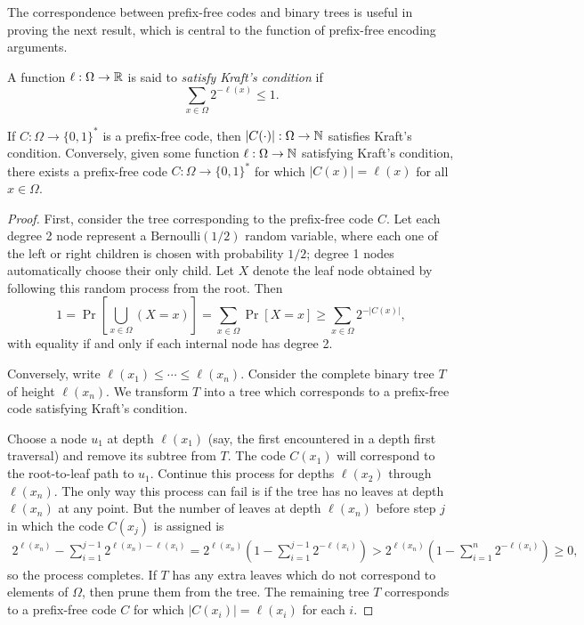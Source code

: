 The correspondence between prefix-free codes and binary trees is
useful in proving the next result, which is central to the function of
prefix-free encoding arguments.
\begin{defn}
  A function $\ell : \Omega \to \mathbb{R}$ is said to \emph{satisfy Kraft's
    condition} if
  \[\sum_{x \in \Omega} 2^{-\ell(x)} \leq 1.\]
\end{defn}

\begin{lem}
  If $C : \Omega \to \{0, 1\}^*$ is a prefix-free code, then
  $|C(\cdot)| : \Omega \to \mathbb{N}$ satisfies Kraft's
  condition. Conversely, given some function $\ell : \Omega \to \mathbb{N}$
  satisfying Kraft's condition, there exists a prefix-free code
  $C : \Omega \to \{0, 1\}^*$ for which $|C(x)| = \ell(x)$ for all
  $x \in \Omega$.
\end{lem}
\begin{proof}
  First, consider the tree corresponding to the prefix-free code
  $C$. Let each degree 2 node represent a $\text{Bernoulli}(1/2)$
  random variable, where each one of the left or right children is
  chosen with probability $1/2$; degree 1 nodes automatically choose
  their only child. Let $X$ denote the leaf node obtained by following
  this random process from the root. Then
  \[1 = \Pr\left[\bigcup_{x \in \Omega} (X = x)\right] = \sum_{x \in \Omega} \Pr[X =
  x] \geq \sum_{x \in \Omega} 2^{-|C(x)|},\]
  with equality if and only if each internal node has degree 2.

  Conversely, write $\ell(x_1) \leq \cdots \leq \ell(x_n)$. Consider
  the complete binary tree $T$ of height $\ell(x_n)$. We transform $T$
  into a tree which corresponds to a prefix-free code satisfying
  Kraft's condition.

  Choose a node $u_1$ at depth $\ell(x_1)$ (say, the first encountered
  in a depth first traversal) and remove its subtree from $T$. The
  code $C(x_1)$ will correspond to the root-to-leaf path to
  $u_1$. Continue this process for depths $\ell(x_2)$ through
  $\ell(x_n)$. The only way this process can fail is if the tree has
  no leaves at depth $\ell(x_n)$ at any point. But the number of
  leaves at depth $\ell(x_n)$ before step $j$ in which the code
  $C(x_j)$ is assigned is
  \begin{align*}
    2^{\ell(x_n)} - \sum_{i = 1}^{j - 1} 2^{\ell(x_n) - \ell(x_i)} =
    2^{\ell(x_n)}\left(1 - \sum_{i = 1}^{j - 1} 2^{-\ell(x_i)}\right)
    > 2^{\ell(x_n)}\left(1 - \sum_{i = 1}^n 2^{-\ell(x_i)}\right)
    \geq 0,
  \end{align*}
  so the process completes. If $T$ has any extra leaves which do not
  correspond to elements of $\Omega$, then prune them from the
  tree. The remaining tree $T$ corresponds to a prefix-free code $C$
  for which $|C(x_i)| = \ell(x_i)$ for each $i$.
\end{proof}

